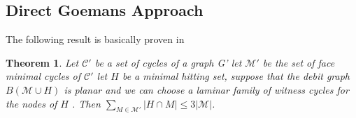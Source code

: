 \documentclass[letterpaper,11pt]{article}
\newtheorem{theorem}{Theorem}[section]
\newtheorem{lemma}[theorem]{Lemma}
\newcommand{\0}{\mathbb{0}}
\newcommand{\1}{\mathbb{1}}
\begin{document}




\subsection{ Direct Goemans Approach}
The following result is basically proven in \cite{GW98}
\begin{theorem} \cite{GW98} \label{general 3 apx}
Let $\mathcal{C'} $ be a set of cycles of a graph G' let $\mathcal{M'} $  be the set of face minimal cycles  of  $ \mathcal{C'}$ let $H$ be a minimal hitting set, suppose that the debit graph $B( \mathcal{M} \cup H)  $ is planar and we can choose a laminar family   of witness cycles for the nodes of $H$ . Then $\sum_{M \in \mathcal{M'} } |H \cap M | \leq 3 |\mathcal{M}|  $.
\end{theorem}
\end{document}

